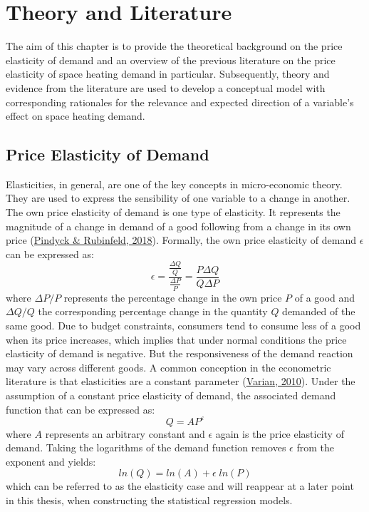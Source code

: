 \documentclass[12pt,twoside]{reedthesis}
\begin{document}
\hypertarget{literature}{%
\chapter{Theory and Literature}\label{literature}}

The aim of this chapter is to provide the theoretical background on the price elasticity of demand and an overview of the previous literature on the price elasticity of space heating demand in particular. Subsequently, theory and evidence from the literature are used to develop a conceptual model with corresponding rationales for the relevance and expected direction of a variable's effect on space heating demand.

\hypertarget{theory}{%
\section{Price Elasticity of Demand}\label{theory}}

Elasticities, in general, are one of the key concepts in micro-economic theory. They are used to express the sensibility of one variable to a change in another. The own price elasticity of demand is one type of elasticity. It represents the magnitude of a change in demand of a good following from a change in its own price (\protect\hyperlink{ref-pindyck_rubinfeld18}{Pindyck \& Rubinfeld, 2018}). Formally, the own price elasticity of demand \(\epsilon\) can be expressed as:
\begin{equation}
\epsilon = \frac{\frac{\Delta Q}{Q}}{\frac{\Delta P}{P}} = \frac{P \Delta Q}{Q \Delta P}
\label{eq:ep}
\end{equation}
where \(\Delta P/P\) represents the percentage change in the own price \(P\) of a good and \(\Delta Q/Q\) the corresponding percentage change in the quantity \(Q\) demanded of the same good. Due to budget constraints, consumers tend to consume less of a good when its price increases, which implies that under normal conditions the price elasticity of demand is negative. But the responsiveness of the demand reaction may vary across different goods. A common conception in the econometric literature is that elasticities are a constant parameter (\protect\hyperlink{ref-varian10}{Varian, 2010}). Under the assumption of a constant price elasticity of demand, the associated demand function that can be expressed as:
\begin{equation}
Q = AP^{\varepsilon}
\label{eq:demand}
\end{equation}
where \(A\) represents an arbitrary constant and \(\epsilon\) again is the price elasticity of demand. Taking the logarithms of the demand function removes \(\epsilon\) from the exponent and yields:
\begin{equation}
ln(Q) = ln(A) + \epsilon \; ln(P)
\label{eq:demand2}
\end{equation}
which can be referred to as the elasticity case and will reappear at a later point in this thesis, when constructing the statistical regression models.
\end{document}
